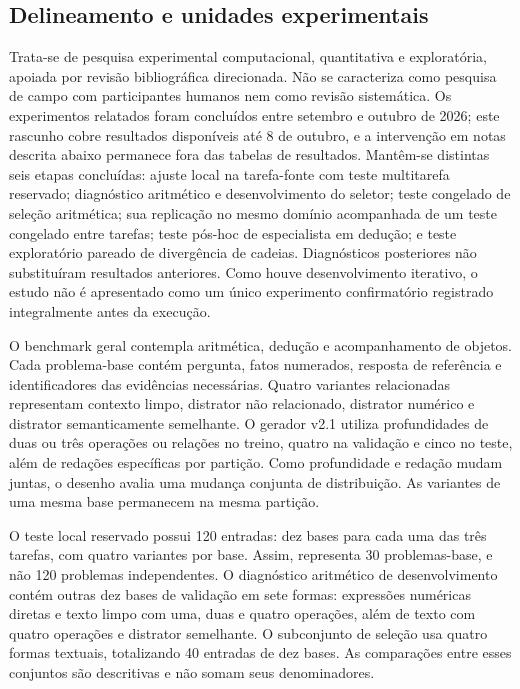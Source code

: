 \documentclass[12pt,a4paper]{article}
\begin{document}
\subsection{Delineamento e unidades experimentais}
Trata-se de pesquisa experimental computacional, quantitativa e exploratória, apoiada por revisão bibliográfica direcionada. Não se caracteriza como pesquisa de campo com participantes humanos nem como revisão sistemática. Os experimentos relatados foram concluídos entre setembro e outubro de 2026; este rascunho cobre resultados disponíveis até 8 de outubro, e a intervenção em notas descrita abaixo permanece fora das tabelas de resultados. Mantêm-se distintas seis etapas concluídas: ajuste local na tarefa-fonte com teste multitarefa reservado; diagnóstico aritmético e desenvolvimento do seletor; teste congelado de seleção aritmética; sua replicação no mesmo domínio acompanhada de um teste congelado entre tarefas; teste pós-hoc de especialista em dedução; e teste exploratório pareado de divergência de cadeias. Diagnósticos posteriores não substituíram resultados anteriores. Como houve desenvolvimento iterativo, o estudo não é apresentado como um único experimento confirmatório registrado integralmente antes da execução.

O benchmark geral contempla aritmética, dedução e acompanhamento de objetos. Cada problema-base contém pergunta, fatos numerados, resposta de referência e identificadores das evidências necessárias. Quatro variantes relacionadas representam contexto limpo, distrator não relacionado, distrator numérico e distrator semanticamente semelhante. O gerador v2.1 utiliza profundidades de duas ou três operações ou relações no treino, quatro na validação e cinco no teste, além de redações específicas por partição. Como profundidade e redação mudam juntas, o desenho avalia uma mudança conjunta de distribuição. As variantes de uma mesma base permanecem na mesma partição.

O teste local reservado possui 120 entradas: dez bases para cada uma das três tarefas, com quatro variantes por base. Assim, representa 30 problemas-base, e não 120 problemas independentes. O diagnóstico aritmético de desenvolvimento contém outras dez bases de validação em sete formas: expressões numéricas diretas e texto limpo com uma, duas e quatro operações, além de texto com quatro operações e distrator semelhante. O subconjunto de seleção usa quatro formas textuais, totalizando 40 entradas de dez bases. As comparações entre esses conjuntos são descritivas e não somam seus denominadores.
\end{document}
